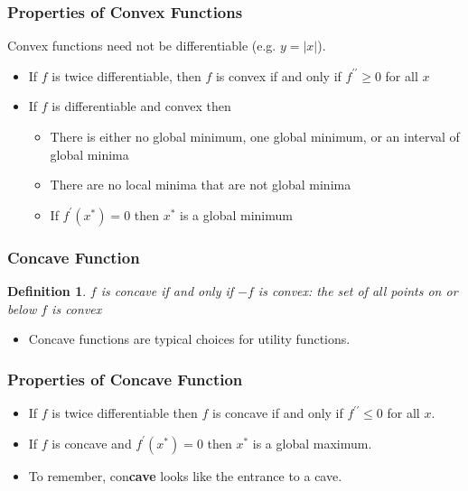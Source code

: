 \documentclass[aspectratio=169, handout]{beamer}
\newtheorem{defn}{Definition}
\numberwithin{equation}{section}
\begin{document}
\begin{frame}
\frametitle{Properties of Convex Functions}

Convex functions need not be differentiable (e.g. $y=|x|$). \pause

\begin{itemize}
\item If $f$ is twice differentiable, then $f$ is convex if and only if $f^{\prime\prime}\geq 0$ for all $x$ \pause

\item If $f$ is differentiable and convex then
\begin{itemize}
\item There is either no global minimum, one global minimum, or an interval of global minima \pause
\item There are no local minima that are not global minima \pause
\item If $f^\prime(x^*)=0$ then $x^*$ is a global minimum \pause
\end{itemize}
\end{itemize}

\end{frame}



\begin{frame}
\frametitle{Concave Function}

\begin{defn}
$f$ is \textit{concave} if and only if $-f$ is convex: the set of all points on or below $f$ is convex
\end{defn} \pause
\begin{itemize}
\item Concave functions are typical choices for utility functions.
\end{itemize}
\end{frame}


\begin{frame}
\frametitle{Properties of Concave Function}
\begin{itemize}
\item If $f$ is twice differentiable then $f$ is concave if and only if $f^{\prime\prime}\leq 0$ for all $x$. \pause

\item If $f$ is concave and $f^\prime(x^*)=0$ then $x^*$ is a global maximum.\pause
\item To remember, con\textbf{cave} looks like the entrance to a cave.
\end{itemize}
\end{frame}
\end{document}
